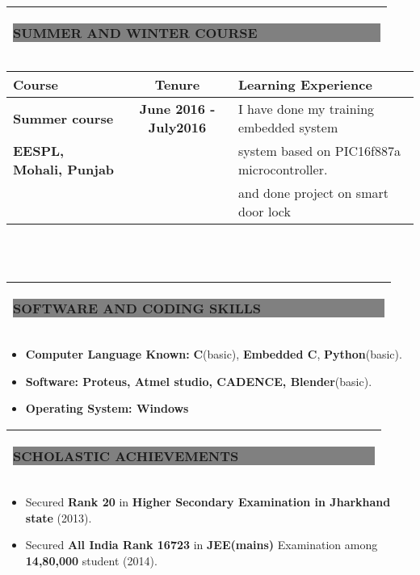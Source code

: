 \documentclass[12pt,a4paper,oneside]{letter}
\begin{document}
\begin{tabular}{|l|}
	\hline
 	\colorbox{gray}{\begin{Large}
	
\textbf{SUMMER AND WINTER COURSE $\qquad$ $\qquad $  $\qquad $  $\qquad$    }
 \end{Large}   }  \\ \hline

\end{tabular}
\begin{tabular}{|l|c|l|}
	\hline
	
	\textbf{Course } & \textbf{Tenure } & \textbf{Learning Experience }\\ \hline
	\textbf{Summer course }&\textbf{June 2016 - July2016 }& I have done my training embedded system\\
	\textbf{EESPL, Mohali, Punjab}& & system based on  PIC16f887a microcontroller.\\
	&  &and done project on smart door lock\\ \hline
	
	
	\end{tabular}\\\\

\begin{tabular}{|l|}
	\hline
	\colorbox{gray}{\begin{Large}
			
			\textbf{SOFTWARE AND CODING SKILLS $\qquad$ $\qquad $  $\qquad $  $\qquad$   }
	\end{Large}   }  \\ \hline
\end{tabular}
\begin{itemize}
	\item \textbf{Computer Language Known: }\textbf{C}(basic), \textbf{Embedded C}, \textbf{Python}(basic).
	\item \textbf{Software:  Proteus, Atmel studio, CADENCE, Blender}(basic).
	\item \textbf{Operating System: Windows} 
\end{itemize}
 
\begin{tabular}{|l|}
	\hline
	\colorbox{gray}{\begin{Large}
			
			\textbf{SCHOLASTIC ACHIEVEMENTS$\qquad$ $\qquad $  $\qquad $  $\qquad$ $\quad$   }
	\end{Large}   }  \\ \hline
\end{tabular}
\begin{itemize}
	\item Secured \textbf{  Rank 20} in \textbf{Higher Secondary Examination in Jharkhand state } (2013). 
	\item Secured \textbf{ All India Rank 16723} in \textbf{JEE(mains)} Examination  among \textbf{14,80,000} student (2014). 
\end{itemize}
\end{document}
